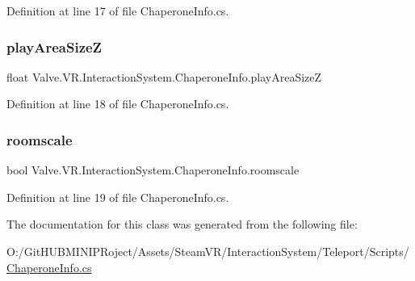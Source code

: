 Definition at line 17 of file Chaperone\+Info.\+cs.

\mbox{\label{class_valve_1_1_v_r_1_1_interaction_system_1_1_chaperone_info_a6101a395253f74ad23a7063e0771c5d5}} 
\subsubsection{\texorpdfstring{playAreaSizeZ}{playAreaSizeZ}}
{\footnotesize\ttfamily float Valve.\+V\+R.\+Interaction\+System.\+Chaperone\+Info.\+play\+Area\+SizeZ\hspace{0.3cm}{\ttfamily [get]}}



Definition at line 18 of file Chaperone\+Info.\+cs.

\mbox{\label{class_valve_1_1_v_r_1_1_interaction_system_1_1_chaperone_info_aa60aa40b735bf1aedf4ab9a88c55da79}} 
\subsubsection{\texorpdfstring{roomscale}{roomscale}}
{\footnotesize\ttfamily bool Valve.\+V\+R.\+Interaction\+System.\+Chaperone\+Info.\+roomscale\hspace{0.3cm}{\ttfamily [get]}}



Definition at line 19 of file Chaperone\+Info.\+cs.



The documentation for this class was generated from the following file\+:\begin{DoxyCompactItemize}
\item 
O\+:/\+Git\+H\+U\+B\+M\+I\+N\+I\+P\+Roject/\+Assets/\+Steam\+V\+R/\+Interaction\+System/\+Teleport/\+Scripts/\mbox{\hyperlink{_chaperone_info_8cs}{Chaperone\+Info.\+cs}}\end{DoxyCompactItemize}
